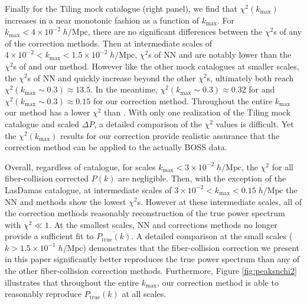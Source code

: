\documentclass{emulateapj}
\begin{document}
Finally for the Tiling mock catalogue (right panel), we find that $\chi^2(k_\mathrm{max})$ increases in a near monotonic fashion as a function of $k_\mathrm{max}$. For $k_\mathrm{max} < 4\times10^{-2} \; h/\mathrm{Mpc}$, there are no significant differences between the $\chi^2$s of any of the correction methods. Then at intermediate scales of $4\times10^{-2} < k_\mathrm{max} < 1.5\times 10^{-2} \; h/\mathrm{Mpc}$, $\chi^2$s of NN and \cite{Beutler:2014aa} are notably lower than the $\chi^2$s of \cite{Gil-Marin:2014aa} and our method. However like the other mock catalogues at smaller scales, the $\chi^2$s of NN and \cite{Beutler:2014aa} quickly increase beyond the other $\chi^2$s, ultimately both reach $\chi^2(k_\mathrm{max} \sim 0.3) \approx 13.5$. In the meantime, $\chi^2(k_\mathrm{max} \sim 0.3) \approx 0.32$ for \cite{Gil-Marin:2014aa} and $\chi^2(k_\mathrm{max} \sim 0.3) \approx 0.15$ for our correction method. Throughout the entire $k_\mathrm{max}$ our method has a lower $\chi^2$ than \cite{Gil-Marin:2014aa}. With only one realization of the Tiling mock catalogue and scaled $\Delta P$, a detailed comparison of the $\chi^2$ values is difficult. Yet the $\chi^2(k_\mathrm{max})$ results for our correction provide realistic assurance that the correction method can be applied to the actually BOSS data.

Overall, regardless of catalogue, for scales $k_\mathrm{max} < 3 \times 10^{-2} \;h/\mathrm{Mpc}$, the $\chi^2$ for all fiber-collision corrected $P(k)$ are negligible. Then, with the exception of the LasDamas catalogue, at intermediate scales of $3 \times 10^{-2} < k_\mathrm{max} < 0.15 \; h/\mathrm{Mpc}$ the NN and \cite{Beutler:2014aa} methods show the lowest $\chi^2$s. However at these intermediate scales, all of the correction methods reasonably reconstruction of the true power spectrum with $\chi^2 \ll 1$. At the smallest scales, NN and \cite{Beutler:2014aa} corrections methods no longer provide a sufficient fit to $\overline{P_\mathrm{true}(k)}$. A detailed comparison at the small scales ($k > 1.5 \times 10^{-1} \;h/\mathrm{Mpc}$) demonstrates that the fiber-collision correction we present in this paper significantly better reproduces the true power spectrum than any of the other fiber-collision correction methods. Furthermore, Figure \ref{fig:peaksnchi2} illustrates that throughout the entire $k_\mathrm{max}$, our correction method is able to reasonably reproduce $P_\mathrm{true}(k)$ at all scales. 
\end{document}
